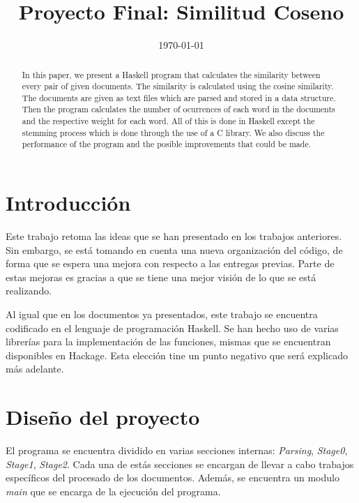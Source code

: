 \documentclass{nrfh-ish}
\title{Proyecto Final: Similitud Coseno}
\author{\authormacro{Gustavo Iván Molina Rebolledo}{\MATRICULA\\Benemérita Universidad Autónoma de Puebla}
}
\date{\today}
\begin{document}
\maketitledoble


\begin{abstract}
  In this paper, we present a Haskell program that calculates the similarity
  between every pair of given documents. The similarity is calculated using
  the cosine similarity. The documents are given as text files which are
  parsed and stored in a data structure. Then the program calculates the
  number of ocurrences of each word in the documents and the respective
  weight for each word. All of this is done in Haskell except the stemming
  process which is done through the use of a C library. We also discuss the
  performance of the program and the posible improvements that could be
  made.
\end{abstract}

\makedate

\clearpage

\section{Introducción}
Este trabajo retoma las ideas que se han presentado en los trabajos anteriores.
Sin embargo, se está tomando en cuenta una nueva organización del código, de
forma que se espera una mejora con respecto a las entregas previas. Parte de
estas mejoras es gracias a que se tiene una mejor visión de lo que se está
realizando.

Al igual que en los documentos ya presentados, este trabajo se encuentra
codificado en el lenguaje de programación Haskell. Se han hecho uso de
varias librerías para la implementación de las funciones, mismas que se
encuentran disponibles en Hackage. Esta elección tine un punto negativo
que será explicado más adelante.

\section{Diseño del proyecto}
El programa se encuentra dividido en varias secciones internas:
\textit{Parsing}, \textit{Stage0}, \textit{Stage1}, \textit{Stage2}.
Cada una de estás secciones se encargan de llevar a cabo trabajos
específicos del procesado de los documentos. Además, se encuentra un
modulo \textit{main} que se encarga de la ejecución del programa.
\end{document}
